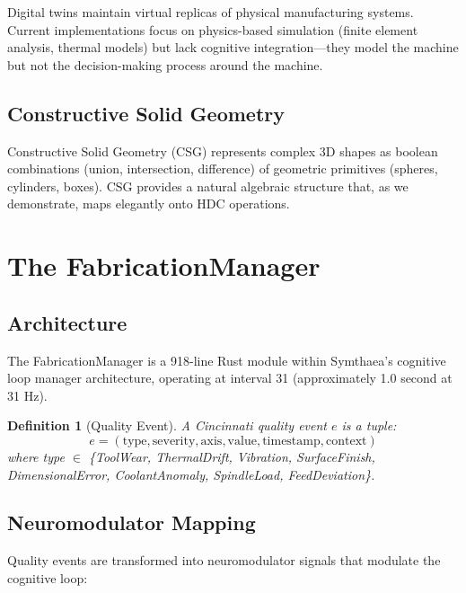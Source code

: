 \documentclass[11pt,a4paper]{article}
\newtheorem{definition}{Definition}
\begin{document}
Digital twins \citep{grieves2014} maintain virtual replicas of physical manufacturing systems. Current implementations focus on physics-based simulation (finite element analysis, thermal models) but lack cognitive integration---they model the machine but not the decision-making process around the machine.

\subsection{Constructive Solid Geometry}

Constructive Solid Geometry (CSG) \citep{requicha1980} represents complex 3D shapes as boolean combinations (union, intersection, difference) of geometric primitives (spheres, cylinders, boxes). CSG provides a natural algebraic structure that, as we demonstrate, maps elegantly onto HDC operations.

\section{The FabricationManager}

\subsection{Architecture}

The FabricationManager is a 918-line Rust module within Symthaea's cognitive loop manager architecture, operating at interval 31 (approximately 1.0 second at 31 Hz).

\begin{definition}[Quality Event]
A Cincinnati quality event $e$ is a tuple:
\begin{equation}
e = (\text{type}, \text{severity}, \text{axis}, \text{value}, \text{timestamp}, \text{context})
\end{equation}
where type $\in$ \{ToolWear, ThermalDrift, Vibration, SurfaceFinish, DimensionalError, CoolantAnomaly, SpindleLoad, FeedDeviation\}.
\end{definition}

\subsection{Neuromodulator Mapping}

Quality events are transformed into neuromodulator signals that modulate the cognitive loop:
\end{document}
